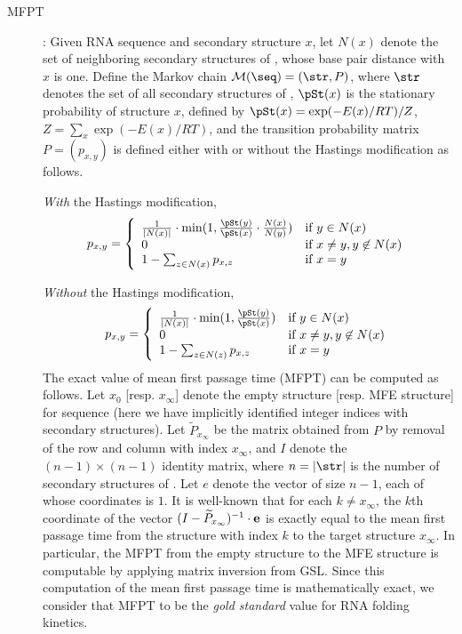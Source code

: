 \begin{description}
\item[MFPT]: Given RNA sequence \seq and secondary structure $x$,
let $N(x)$ denote the set of neighboring secondary structures of
\seq, whose base pair distance with $x$ is one. Define the Markov
chain $\mathcal{M}(\seq)=(\str,P)$, where $\str$ denotes the
set of all secondary structures of \seq, $\pSt(x)$ is the stationary
probability of structure $x$, defined by $\pSt(x)=\exp(-E(x)/RT)/Z$,
$Z=\sum_{x} \exp(-E(x)/RT)$, and the transition probability matrix $P
= ( p_{x,y} )$ is defined either with or without the Hastings
modification as follows.

{\em With} the Hastings modification,
\begin{align}
\label{eq:MFPTwithHastings} p_{x,y} = \left\{
\begin{array}{ll}
\frac{1}{|N(x)|} \cdot \min(1, \frac{\pSt(y)}{\pSt(x)} \cdot
\frac{N(x)}{N(y)}) &\mbox{if $y \in N(x)$}\\
0 &\mbox{if $x \ne y, y \not\in N(x)$}\\
1 - \sum_{\substack{z \in N(x)}} p_{x,z} &\mbox{if $x=y$}\\
\end{array}
\right.
\end{align}

{\em Without} the Hastings modification,
\begin{align}
\label{eq:MFPTwithoutHastings} p_{x,y} = \left\{
\begin{array}{ll}
\frac{1}{|N(x)|} \cdot \min(1, \frac{\pSt(y)}{\pSt(x)} ) &\mbox{if $y
\in N(x)$}\\
0 &\mbox{if $x \ne y, y \not\in N(x)$}\\
1 - \sum_{\substack{z \in N(z)}} p_{x,z} &\mbox{if $x=y$}\\
\end{array}
\right.
\end{align}
The exact value of mean first passage time (MFPT) can be computed as
follows. Let $x_0$ [resp. $x_{\infty}$] denote the empty structure
[resp. MFE structure] for sequence \seq (here we have implicitly
identified integer indices with secondary structures). Let
$\widetilde{P}_{x_{\infty}}$ be the matrix obtained from $P$ by
removal of the row and column with index $x_{\infty}$, and $I$ denote
the $(n-1)\times(n-1)$ identity matrix, where $n=|\str|$ is the
number of secondary structures of \seq. Let $e$ denote the vector of
size $n-1$, each of whose coordinates is $1$. It is well-known
\cite{meyerMFPT} that for each $k\ne x_{\infty}$, the $k$th coordinate
of the vector $(I - \widetilde{P}_{x_{\infty}})^{-1} \cdot {\bf e}$ is
exactly equal to the mean first passage time from the structure with
index $k$ to the target structure $x_{\infty}$. In particular, the
MFPT from the empty structure to the MFE structure is computable by
applying matrix inversion from GSL. Since this computation of the
mean first passage time is mathematically exact, we consider that MFPT
to be the {\em gold standard} value for RNA folding kinetics.


\end{description}
